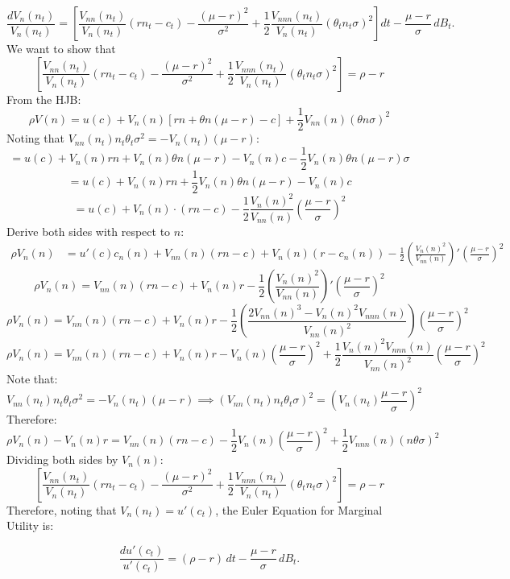\documentclass[11pt]{extarticle}
\theoremstyle{plain}
\theoremstyle{definition}
\begin{document}
\begin{enumerate}[(a)]
\[
\frac{d V_n(n_t)}{V_n(n_t)} = \left[ \frac{V_{nn}(n_t)}{V_n(n_t)} \left( r n_t - c_t \right) - \frac{(\mu - r)^2}{\sigma^2} + \frac{1}{2} \frac{V_{nnn}(n_t)}{V_{n}(n_t)} (\theta_t n_t \sigma)^2  \right] dt - \frac{\mu - r}{\sigma} \, dB_t.
\]
We want to show that $$\left[ \frac{V_{nn}(n_t)}{V_n(n_t)} \left( r n_t - c_t \right) - \frac{(\mu - r)^2}{\sigma^2} + \frac{1}{2} \frac{V_{nnn}(n_t)}{V_{n}(n_t)} (\theta_t n_t \sigma)^2  \right] = \rho - r$$
From the HJB:
\[
\rho V(n) = u(c) + V_n(n) \left[ r n + \theta n (\mu - r) - c \right] + \frac{1}{2} V_{nn}(n) (\theta n \sigma)^2
\]
Noting that $ V_{nn}(n_t) n_t \theta_t \sigma^2 = - V_n(n_t) (\mu - r)$:
\[
= u(c) + V_n(n) r n + V_n(n) \theta n (\mu - r) - V_n(n) c - \frac{1}{2} V_{n}(n) \theta n (\mu - r) \sigma
\]
\[
= u(c) + V_n(n) r n + \frac{1}{2} V_n(n) \theta n (\mu - r) - V_n(n) c
\]
\[
= u(c) + V_n(n) \cdot (rn - c) - \frac{1}{2} \frac{V_n(n)^2}{V_{nn}(n)} \left( \frac{\mu - r}{\sigma} \right)^2
\]
Derive both sides with respect to $n$:
\[
\begin{aligned}
\rho V_n(n) &= u'(c) c_n(n) + V_{nn}(n) (r n - c) + V_n(n) (r - c_n(n)) - \frac{1}{2} \left( \frac{V_n(n)^2}{V_{nn}(n)} \right)' \left( \frac{\mu - r}{\sigma} \right)^2
\end{aligned}
\]
\[
\rho V_n(n) = V_{nn}(n) (r n - c) + V_n(n) r - \frac{1}{2} \left( \frac{V_n(n)^2}{V_{nn}(n)} \right)' \left( \frac{\mu - r}{\sigma} \right)^2
\]
\[
\rho V_n(n) = V_{nn}(n) (r n - c) + V_n(n) r - \frac{1}{2} \left(\frac{2V_{nn}(n)^3 - V_n(n)^2 V_{nnn}(n)}{V_{nn}(n)^2}\right) \left( \frac{\mu - r}{\sigma} \right)^2
\]
\[
\rho V_n(n) = V_{nn}(n) (r n - c) + V_n(n) r - V_n(n) \left( \frac{\mu - r}{\sigma} \right)^2 + \frac{1}{2}\frac{V_n(n)^2 V_{nnn}(n)}{V_{nn}(n)^2}\left( \frac{\mu - r}{\sigma} \right)^2
\]
Note that: 
   \[
   V_{nn}(n_t) n_t \theta_t \sigma^2 = - V_n(n_t) (\mu - r) \implies  (V_{nn}(n_t) n_t \theta_t \sigma)^2 = (V_n(n_t) \frac{\mu - r}{\sigma})^2
   \]
Therefore:
\[
\rho V_n(n) - V_n(n) r  = V_{nn}(n) (r n - c) - \frac{1}{2} V_n(n) \left( \frac{\mu - r}{\sigma} \right)^2 + \frac{1}{2} V_{nnn}(n)(n\theta \sigma)^2
\]
Dividing both sides by $V_n(n)$:
$$\left[ \frac{V_{nn}(n_t)}{V_n(n_t)} \left( r n_t - c_t \right) - \frac{(\mu - r)^2}{\sigma^2} + \frac{1}{2} \frac{V_{nnn}(n_t)}{V_{n}(n_t)} (\theta_t n_t \sigma)^2  \right] = \rho - r$$
Therefore, noting that $V_n(n_t)=u'(c_t)$, the Euler Equation for Marginal Utility is:

\[
\frac{d u'(c_t)}{u'(c_t)} = (\rho - r) \, dt - \frac{\mu - r}{\sigma} \, dB_t.
\]


\end{enumerate}
\end{document}
